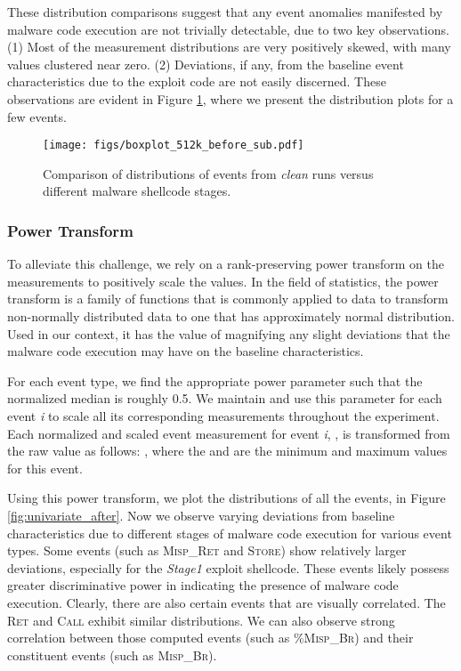 \documentclass{acm_proc_article-sp}
\begin{document}

These distribution comparisons suggest that any event anomalies manifested by malware code execution are not trivially detectable, due to two key observations. (1) Most of the measurement distributions are very positively skewed, with many values clustered near zero. (2) Deviations, if any, from the baseline event characteristics due to the exploit code are not easily discerned. These observations are evident in Figure \ref{fig:univariate_before_sub}, where we present the distribution plots for a few events.

\begin{figure}
  \centering
  \texttt{[image: figs/boxplot\_512k\_before\_sub.pdf]}
  \caption{Comparison of distributions of events from \textit{clean} runs versus different malware shellcode stages.}
  \label{fig:univariate_before_sub}
\end{figure}

\subsubsection{Power Transform}

To alleviate this challenge, we rely on a rank-preserving power transform on the measurements to positively scale the values. In the field of statistics, the power transform is a family of functions that is commonly applied to data to transform non-normally distributed data to one that has approximately normal distribution. Used in our context, it has the value of magnifying any slight deviations that the malware code execution may have on the baseline characteristics.

For each event type, we find the appropriate power parameter  such that the normalized median is roughly 0.5. We maintain and use this parameter  for each event \textit{i} to scale all its corresponding measurements throughout the experiment. Each normalized and scaled event measurement for event \textit{i}, , is transformed from the raw value  as follows: , where the  and  are the minimum and maximum values for this event.

Using this power transform, we plot the distributions of all the events, in Figure \ref{fig:univariate_after}. Now we observe varying deviations from baseline characteristics due to different stages of malware code execution for various event types. Some events (such as \textsc{Misp\_Ret} and \textsc{Store}) show relatively larger deviations, especially for the \textit{Stage1} exploit shellcode. These events likely possess greater discriminative power in indicating the presence of malware code execution. Clearly, there are also certain events that are visually correlated. The \textsc{Ret} and \textsc{Call} exhibit similar distributions. We can also observe strong correlation between those computed events (such as \textsc{\%Misp\_Br}) and their constituent events (such as \textsc{Misp\_Br}).
\end{document}
